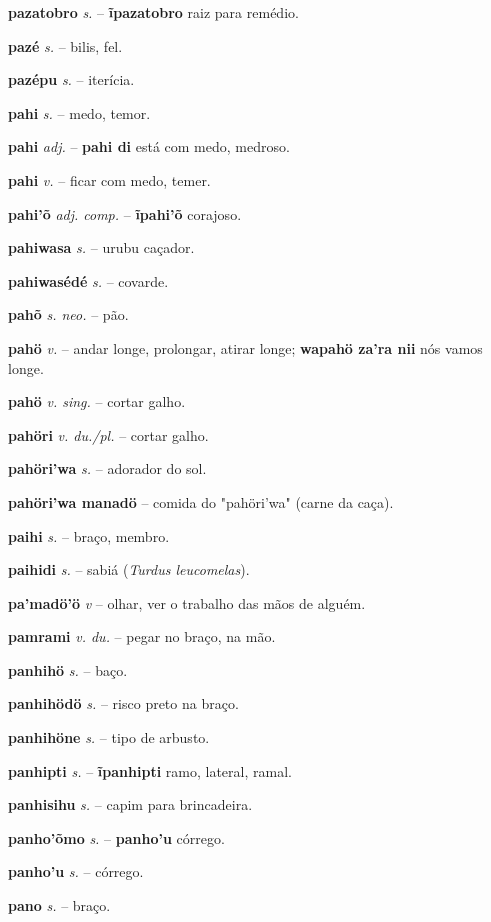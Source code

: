 \textbf{pazatobro} \textit{s.} -- \textbf{ĩpazatobro} raiz para remédio.

\textbf{pazé} \textit{s.} -- bilis, fel.

\textbf{pazépu} \textit{s.} -- iterícia.

\textbf{pahi} \textit{s.} -- medo, temor.

\textbf{pahi} \textit{adj.} -- \textbf{pahi di} está com medo, medroso.

\textbf{pahi} \textit{v.} -- ficar com medo, temer.

\textbf{pahi'õ} \textit{adj. comp.} -- \textbf{ĩpahi'õ} corajoso.

\textbf{pahiwasa} \textit{s.} -- urubu caçador.

\textbf{pahiwasédé} \textit{s.} -- covarde.

\textbf{pahõ} \textit{s. neo.} -- pão.

\textbf{pahö} \textit{v.} -- andar longe, prolongar, atirar longe; \textbf{wapahö za'ra nii} nós vamos longe.

\textbf{pahö} \textit{v. sing.} -- cortar galho.

\textbf{pahöri} \textit{v. du./pl.} -- cortar galho.

\textbf{pahöri'wa} \textit{s.} -- adorador do sol.

\textbf{pahöri'wa manadö} -- comida do "pahöri'wa" (carne da caça).

\textbf{paihi} \textit{s.} -- braço, membro.

\textbf{paihidi} \textit{s.} -- sabiá (\textit{Turdus leucomelas}).

\textbf{pa'madö'ö} \textit{v} -- olhar, ver o trabalho das mãos de alguém.

\textbf{pamrami} \textit{v. du.} -- pegar no braço, na mão.

\textbf{panhihö} \textit{s.} -- baço.

\textbf{panhihödö} \textit{s.} -- risco preto na braço.

\textbf{panhihöne} \textit{s.} -- tipo de arbusto.

\textbf{panhipti} \textit{s.} -- \textbf{ĩpanhipti} ramo, lateral, ramal.

\textbf{panhisihu} \textit{s.} -- capim para brincadeira.

\textbf{panho'õmo} \textit{s.} -- \textbf{panho'u} córrego.

\textbf{panho'u} \textit{s.} -- córrego.

\textbf{pano} \textit{s.} -- braço.

